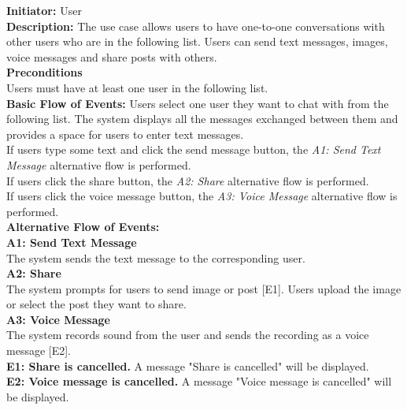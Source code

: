 \documentclass[11pt, a4paper]{article}
\begin{document}
\begin{figure}[H]
    \centering
    
\end{figure}

\textbf{Initiator: }User\\
\textbf{Description: }The use case allows users to have one-to-one conversations with other users who are in the following list. Users can send text messages, images, voice messages and share posts with others.\\
\textbf{Preconditions }\\
Users must have at least one user in the following list.\\
\textbf{ Basic Flow of Events: }Users select one user they want to chat with from the following list. The system displays all the messages exchanged between them and provides a space for users to enter text messages.\\
If users type some text and click the send message button, the \textit{A1: Send Text Message} alternative flow is performed.\\
If users click the share button, the \textit{A2: Share} alternative flow is performed.\\
If users click the voice message button, the \textit{A3: Voice Message} alternative flow is performed.\\
\textbf{Alternative Flow of Events: }\\
\textbf{A1: Send Text Message}\\
The system sends the text message to the corresponding user.\\
\textbf{A2: Share}\\
The system prompts for users to send image or post [E1]. Users upload the image or select the post they want to share.\\
\textbf{A3: Voice Message}\\
The system records sound from the user and sends the recording as a voice message [E2].\\
\textbf{E1: Share is cancelled.} A message "Share is cancelled" will be displayed.\\
\textbf{E2: Voice message is cancelled.} A message "Voice message is cancelled" will be displayed.\\
\end{document}
